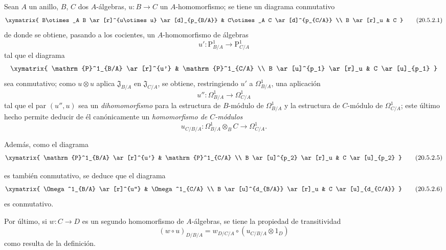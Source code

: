 \begin{env}[20.5.2]
\label{0.20.5.2-fr}
Sean $A$ un anillo, $B$, $C$ dos $A$-álgebras, $u:B\to C$ un
$A$-homomorfismo; se tiene un diagrama conmutativo
\[
\xymatrix{
  B\otimes_A B \ar[r]^{u\otimes u} \ar[d]_{p_{B/A}} &
  C\otimes_A C \ar[d]^{p_{C/A}} \\
  B \ar[r]_u & C
}
\tag{20.5.2.1}
\label{0.20.5.2.1-fr}
\]
de donde se obtiene, pasando a los cocientes, un $A$-homomorfismo de álgebras
\begin{equation}
\tag{20.5.2.2}
\label{0.20.5.2.2-fr}
  u':\mathrm{P}^1_{B/A}\to\mathrm{P}^1_{C/A}
\end{equation}
tal que el diagrama
\[
\xymatrix{
  \mathrm{P}^1_{B/A} \ar[r]^{u'} & \mathrm{P}^1_{C/A} \\
  B \ar[u]^{p_1} \ar[r]_u & C \ar[u]_{p_1}
}
\]
sea conmutativo; como $u\otimes u$ aplica $\mathfrak{J}_{B/A}$ en
$\mathfrak{J}_{C/A}$, se obtiene, restringiendo $u'$ a
$\Omega^1_{B/A}$, una aplicación
\begin{equation}
\tag{20.5.2.3}
\label{0.20.5.2.3-fr}
  u'':\Omega^1_{B/A}\to\Omega^1_{C/A}
\end{equation}
tal que el par $(u'',u)$ sea un \emph{dihomomorfismo} para la
estructura de $B$-módulo de $\Omega^1_{B/A}$ y la estructura de $C$-módulo de
$\Omega^1_{C/A}$; este último hecho permite deducir de él canónicamente un
\emph{homomorfismo de $C$-módulos}
\begin{equation}
\tag{20.5.2.4}
\label{0.20.5.2.4-fr}
  u_{C/B/A}:\Omega^1_{B/A}\otimes_B C\to\Omega^1_{C/A}.
\end{equation}


Además, como el diagrama
\[
\xymatrix{
  \mathrm{P}^1_{B/A} \ar[r]^{u'} & \mathrm{P}^1_{C/A} \\
  B \ar[u]^{p_2} \ar[r]_u & C \ar[u]_{p_2}
}
\tag{20.5.2.5}
\label{0.20.5.2.5-fr}
\]

es también conmutativo, se deduce que el diagrama
\[
\xymatrix{
  \Omega^1_{B/A} \ar[r]^{u''} & \Omega^1_{C/A} \\
  B \ar[u]^{d_{B/A}} \ar[r]_u & C \ar[u]_{d_{C/A}}
}
\tag{20.5.2.6}
\label{0.20.5.2.6-fr}
\]
es conmutativo.

Por último, si $w:C\to D$ es un segundo homomorfismo de $A$-álgebras, se tiene la
propiedad de transitividad
\begin{equation}
\tag{20.5.2.7}
\label{0.20.5.2.7-fr}
  (w\circ u)_{D/B/A}
  =w_{D/C/A}\circ(u_{C/B/A}\otimes1_D)
\end{equation}
como resulta de la definición.
\end{env}

